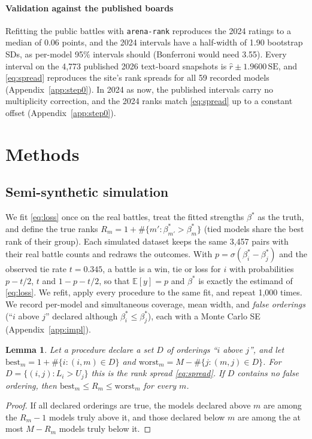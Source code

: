 \documentclass[12pt]{article}
\newtheorem{lemma}{Lemma}
\newcommand{\SE}{\mathrm{SE}}
\begin{document}
\paragraph{Validation against the published boards} Refitting the public battles with \texttt{arena-rank} reproduces the 2024 ratings to a median of 0.06 points, and the 2024 intervals have a half-width of 1.90 bootstrap SDs, as per-model 95\% intervals should (Bonferroni would need 3.55). Every interval on the 4,773 published 2026 text-board snapshots is $\hat r \pm 1.9600\,\SE$, and \eqref{eq:spread} reproduces the site's rank spreads for all 59 recorded models (Appendix~\ref{app:step0}). In 2024 as now, the published intervals carry no multiplicity correction, and the 2024 ranks match \eqref{eq:spread} up to a constant offset (Appendix~\ref{app:step0}).

\section{Methods}\label{sec:methods}

\subsection{Semi-synthetic simulation}\label{sec:sim}

We fit \eqref{eq:loss} once on the real battles, treat the fitted strengths $\beta^*$ as the truth, and define the true ranks $R_m = 1 + \#\{m' : \beta^*_{m'} > \beta^*_m\}$ (tied models share the best rank of their group). Each simulated dataset keeps the same 3,457 pairs with their real battle counts and redraws the outcomes. With $p = \sigma(\beta^*_i - \beta^*_j)$ and the observed tie rate $t = 0.345$, a battle is a win, tie or loss for $i$ with probabilities $p - t/2$, $t$ and $1 - p - t/2$, so that $\mathbb E[y] = p$ and $\beta^*$ is exactly the estimand of \eqref{eq:loss}. We refit, apply every procedure to the same fit, and repeat 1,000 times. We record per-model and simultaneous coverage, mean width, and \emph{false orderings} (``$i$ above $j$'' declared although $\beta^*_i \le \beta^*_j$), each with a Monte Carlo SE (Appendix~\ref{app:impl}).

\begin{lemma}\label{lem:orderings}
Let a procedure declare a set $D$ of orderings ``$i$ above $j$'', and let $\text{best}_m = 1 + \#\{i : (i, m) \in D\}$ and $\text{worst}_m = M - \#\{j : (m, j) \in D\}$. For $D = \{(i, j) : L_i > U_j\}$ this is the rank spread \eqref{eq:spread}. If $D$ contains no false ordering, then $\text{best}_m \le R_m \le \text{worst}_m$ for every $m$.
\end{lemma}
\begin{proof}
If all declared orderings are true, the models declared above $m$ are among the $R_m - 1$ models truly above it, and those declared below $m$ are among the at most $M - R_m$ models truly below it.
\end{proof}
\end{document}
